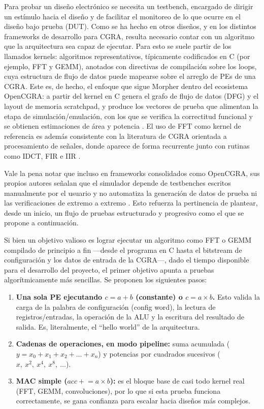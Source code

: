 \documentclass[conference]{IEEEtran}
\begin{document}
Para probar un diseño electrónico se necesita un testbench, encargado de dirigir un estímulo hacia el diseño y de facilitar el monitoreo de lo que ocurre en el diseño bajo prueba (DUT). Como se ha hecho en otros diseños, y en los distintos frameworks de desarrollo para CGRA, resulta necesario contar con un algoritmo que la arquitectura sea capaz de ejecutar. Para esto se suele partir de los llamados kernels: algoritmos representativos, típicamente codificados en C (por ejemplo, FFT y GEMM), anotados con directivas de compilación sobre los loops, cuya estructura de flujo de datos puede mapearse sobre el arreglo de PEs de una CGRA. Este es, de hecho, el enfoque que sigue Morpher dentro del ecosistema OpenCGRA: a partir del kernel en C genera el grafo de flujo de datos (DFG) y el layout de memoria scratchpad, y produce los vectores de prueba que alimentan la etapa de simulación/emulación, con los que se verifica la correctitud funcional y se obtienen estimaciones de área y potencia \cite{Juneja}. El uso de FFT como kernel de referencia es además consistente con la literatura de CGRA orientada a procesamiento de señales, donde aparece de forma recurrente junto con rutinas como IDCT, FIR e IIR \cite{Podobas}.

Vale la pena notar que incluso en frameworks consolidados como OpenCGRA, sus propios autores señalan que el simulador depende de testbenches escritos manualmente por el usuario y no automatiza la generación de datos de prueba ni las verificaciones de extremo a extremo \cite{Juneja}. Esto refuerza la pertinencia de plantear, desde un inicio, un flujo de pruebas estructurado y progresivo como el que se propone a continuación.

Si bien un objetivo valioso es lograr ejecutar un algoritmo como FFT o GEMM compilado de principio a fin ---desde el programa en C hasta el bitstream de configuración y los datos de entrada de la CGRA---, dado el tiempo disponible para el desarrollo del proyecto, el primer objetivo apunta a pruebas algorítmicamente más sencillas. Se proponen los siguientes pasos:

\begin{enumerate}
    \item \textbf{Una sola PE ejecutando $c = a + b$ (constante) o $c = a \times b$.} Esto valida la carga de la palabra de configuración (config word), la lectura de registros/entradas, la operación de la ALU y la escritura del resultado de salida. Es, literalmente, el ``hello world'' de la arquitectura.
    \item \textbf{Cadenas de operaciones, en modo pipeline:} suma acumulada ($y = x_0 + x_1 + x_2 + \dots + x_n$) y potencias por cuadrados sucesivos ($x,\ x^2,\ x^4,\ x^8,\ \dots$).
    \item \textbf{MAC simple ($acc \mathrel{+}= a \times b$):} es el bloque base de casi todo kernel real (FFT, GEMM, convoluciones), por lo que si esta prueba funciona correctamente, se gana confianza para escalar hacia diseños más complejos.
\end{enumerate}
\end{document}
